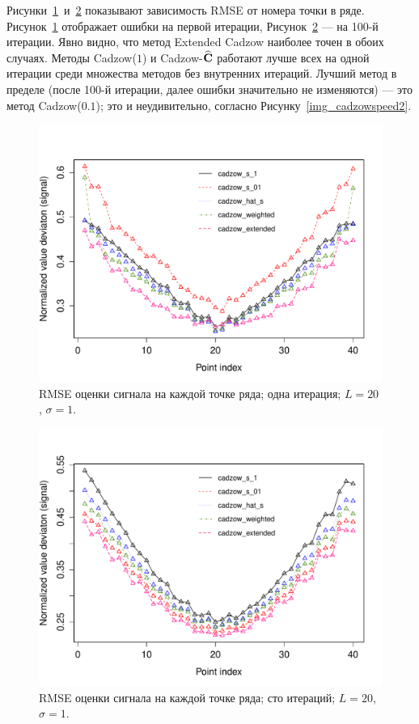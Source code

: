 \documentclass[12pt, specialist, subf,href,colorlinks=true,substylefile = spbu.rtx]{disser}
\theoremstyle{remark}
\theoremstyle{definition}
\begin{document}
Рисунки~\ref{fig:s1_it1}~и~\ref{fig:s1_it100} показывают зависимость RMSE от номера точки в ряде. Рисунок~\ref{fig:s1_it1} отображает ошибки на первой итерации, Рисунок~\ref{fig:s1_it100} --- на 100-й итерации. Явно видно, что метод Extended Cadzow наиболее точен в обоих случаях. Методы Cadzow($1$) и Cadzow-$\widehat{\mathbf{C}}$ работают лучше всех на одной итерации среди множества методов без внутренних итераций. Лучший метод в пределе (после 100-й итерации, далее ошибки значительно не изменяются) --- это метод Cadzow($0.1$); это и неудивительно, согласно Рисунку~\ref{img_cadzowspeed2}.

\begin{figure}[!hhh]
	\includegraphics[width = \columnwidth]{s1_it1.pdf}
	\caption{RMSE оценки сигнала на каждой точке ряда; одна итерация; $L=20$, $\sigma=1$.}
	\label{fig:s1_it1}
\end{figure}

\begin{figure}[!hhh]
	\includegraphics[width = \columnwidth]{s1_it100.pdf}
	\caption{RMSE оценки сигнала на каждой точке ряда; сто итераций; $L=20$, $\sigma=1$.}
	\label{fig:s1_it100}
\end{figure}
\end{document}
